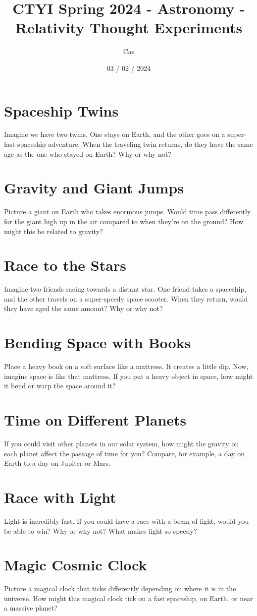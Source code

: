 \documentclass{article}
\title{CTYI Spring 2024 - Astronomy - Relativity Thought Experiments}
\author{Cas}
\date{03 / 02 / 2024}
\begin{document}
\maketitle
\section{Spaceship Twins}
 Imagine we have two twins. One stays on Earth, and the other goes on a super-fast spaceship adventure. When the traveling twin returns, do they have the same age as the one who stayed on Earth? Why or why not?
\section{Gravity and Giant Jumps}
Picture a giant on Earth who takes enormous jumps. Would time pass differently for the giant high up in the air compared to when they're on the ground? How might this be related to gravity?
\section{Race to the Stars}
Imagine two friends racing towards a distant star. One friend takes a spaceship, and the other travels on a super-speedy space scooter. When they return, would they have aged the same amount? Why or why not?
\section{Bending Space with Books}
 Place a heavy book on a soft surface like a mattress. It creates a little dip. Now, imagine space is like that mattress. If you put a heavy object in space, how might it bend or warp the space around it?
 \section{Time on Different Planets}
 If you could visit other planets in our solar system, how might the gravity on each planet affect the passage of time for you? Compare, for example, a day on Earth to a day on Jupiter or Mars.
\section{Race with Light}
Light is incredibly fast. If you could have a race with a beam of light, would you be able to win? Why or why not? What makes light so speedy?
\section{Magic Cosmic Clock}
 Picture a magical clock that ticks differently depending on where it is in the universe. How might this magical clock tick on a fast spaceship, on Earth, or near a massive planet?




 
 
 
 
 
 
 
 
 
 
 
 
 
 
 
 
 
 
 
 
\end{document}
